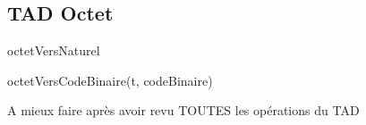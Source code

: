 \subsection{TAD Octet}

\begin{tad}
    \begin{tadOperations}{octetVersNaturel}
    \end{tadOperations}

    \begin{tadPreconditions}{octetVersCodeBinaire(t, codeBinaire)}
    \end{tadPreconditions}

    \begin{tadAxiomes}{}
        A mieux faire 	après avoir revu TOUTES les opérations du TAD
    \end{tadAxiomes}

\end{tad}
